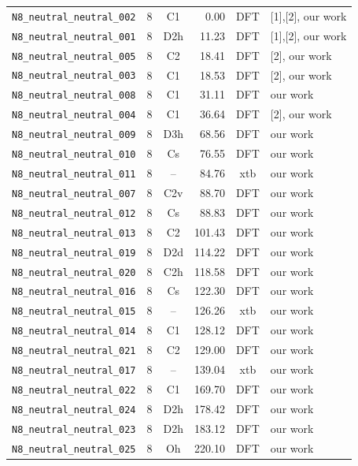 {\begin{longtable}{@{}p{4.7cm}ccrcp{1.6cm}@{}}
\addlinespace
\texttt{N8\_neutral\_neutral\_002} & 8 & C1 & 0.00 & DFT & [1],[2], our work \\
\texttt{N8\_neutral\_neutral\_001} & 8 & D2h & 11.23 & DFT & [1],[2], our work \\
\texttt{N8\_neutral\_neutral\_005} & 8 & C2 & 18.41 & DFT & [2], our work \\
\texttt{N8\_neutral\_neutral\_003} & 8 & C1 & 18.53 & DFT & [2], our work \\
\texttt{N8\_neutral\_neutral\_008} & 8 & C1 & 31.11 & DFT & our work \\
\texttt{N8\_neutral\_neutral\_004} & 8 & C1 & 36.64 & DFT & [2], our work \\
\texttt{N8\_neutral\_neutral\_009} & 8 & D3h & 68.56 & DFT & our work \\
\texttt{N8\_neutral\_neutral\_010} & 8 & Cs & 76.55 & DFT & our work \\
\texttt{N8\_neutral\_neutral\_011} & 8 & -- & 84.76 & xtb & our work \\
\texttt{N8\_neutral\_neutral\_007} & 8 & C2v & 88.70 & DFT & our work \\
\texttt{N8\_neutral\_neutral\_012} & 8 & Cs & 88.83 & DFT & our work \\
\texttt{N8\_neutral\_neutral\_013} & 8 & C2 & 101.43 & DFT & our work \\
\texttt{N8\_neutral\_neutral\_019} & 8 & D2d & 114.22 & DFT & our work \\
\texttt{N8\_neutral\_neutral\_020} & 8 & C2h & 118.58 & DFT & our work \\
\texttt{N8\_neutral\_neutral\_016} & 8 & Cs & 122.30 & DFT & our work \\
\texttt{N8\_neutral\_neutral\_015} & 8 & -- & 126.26 & xtb & our work \\
\texttt{N8\_neutral\_neutral\_014} & 8 & C1 & 128.12 & DFT & our work \\
\texttt{N8\_neutral\_neutral\_021} & 8 & C2 & 129.00 & DFT & our work \\
\texttt{N8\_neutral\_neutral\_017} & 8 & -- & 139.04 & xtb & our work \\
\texttt{N8\_neutral\_neutral\_022} & 8 & C1 & 169.70 & DFT & our work \\
\texttt{N8\_neutral\_neutral\_024} & 8 & D2h & 178.42 & DFT & our work \\
\texttt{N8\_neutral\_neutral\_023} & 8 & D2h & 183.12 & DFT & our work \\
\texttt{N8\_neutral\_neutral\_025} & 8 & Oh & 220.10 & DFT & our work \\

\end{longtable}}
